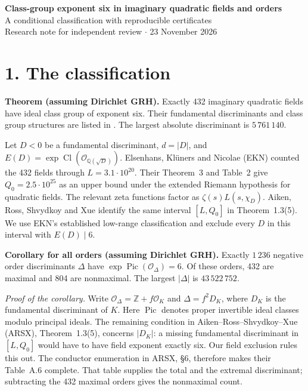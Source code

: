 \documentclass[11pt,letterpaper]{article}
\newcommand{\Cl}{\operatorname{Cl}}
\newcommand{\file}[1]{\texttt{\detokenize{#1}}}
\begin{document}
\begin{center}
{\Large\bfseries Class-group exponent six in imaginary quadratic fields and orders}\\[5pt]
{\large A conditional classification with reproducible certificates}\\[5pt]
Research note for independent review \(\cdot\) 23 November 2026
\end{center}

\section*{1. The classification}
\textbf{Theorem (assuming Dirichlet GRH).}
Exactly 432 imaginary quadratic fields have ideal class group of exponent six.
Their fundamental discriminants and class group structures are listed in
\file{known_exponent_six.csv}. The largest absolute discriminant is \(5\,761\,140\).

Let \(D<0\) be a fundamental discriminant, \(d=|D|\), and
\(E(D)=\exp\Cl(\mathcal O_{\mathbb Q(\sqrt D)})\).
Elsenhans, Kl\"uners and Nicolae (EKN) counted the 432 fields through
\(L=3.1\cdot10^{20}\). Their Theorem~3 and Table~2 give
\(Q_0=2.5\cdot10^{25}\) as an upper bound under the extended Riemann
hypothesis for quadratic fields. The relevant zeta functions factor as
\(\zeta(s)L(s,\chi_D)\). Aiken, Ross, Shvydkoy and Xue identify the same
interval \([L,Q_0]\) in Theorem~1.3(5). We use EKN's established low-range
classification and exclude every \(D\) in this interval with \(E(D)\mid6\).

\textbf{Corollary for all orders (assuming Dirichlet GRH).}
Exactly \(1\,236\) negative order discriminants \(\Delta\) have
\(\exp\operatorname{Pic}(\mathcal O_\Delta)=6\). Of these orders, 432 are
maximal and 804 are nonmaximal. The largest \(|\Delta|\) is \(43\,522\,752\).

\emph{Proof of the corollary.}
Write \(\mathcal O_\Delta=\mathbb Z+f\mathcal O_K\) and \(\Delta=f^2D_K\),
where \(D_K\) is the fundamental discriminant of \(K\). Here
\(\operatorname{Pic}\) denotes proper invertible ideal classes modulo
principal ideals. The remaining condition in Aiken--Ross--Shvydkoy--Xue
(ARSX), Theorem~1.3(5), concerns \(|D_K|\): a missing fundamental
discriminant in \([L,Q_0]\) would have to have field exponent exactly six.
Our field exclusion rules this out. The conductor enumeration in ARSX,
\S6, therefore makes their Table~A.6 complete. That table supplies the
total and the extremal discriminant; subtracting the 432 maximal orders
gives the nonmaximal count.
\end{document}
